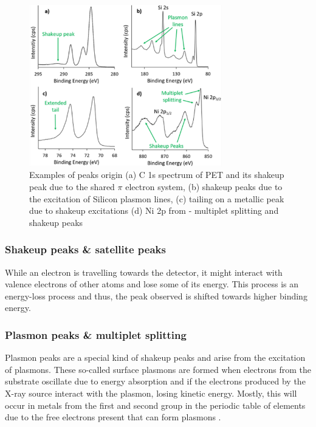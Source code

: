 \begin{figure}[H]
    \centering
    \includegraphics[width=0.75\textwidth]{Figures/peaks.png}
    \caption{Examples of peaks origin (a) C 1s spectrum of PET and its shakeup peak due to the shared $\pi$ electron system, (b) shakeup peaks due to the excitation of Silicon plasmon lines, (c) tailing on a metallic peak due to shakeup excitations (d) Ni 2p from  - multiplet splitting and shakeup peaks \cite{stevie_introduction_2020}}
    \label{fig:peaks}
\end{figure}

\subsubsection{Shakeup peaks \& satellite peaks}

While an electron is travelling towards the detector, it might interact with valence electrons of other atoms and lose some of its energy. This process is an energy-loss process and thus, the peak observed is shifted towards higher binding energy.

\subsubsection{Plasmon peaks \& multiplet splitting}

Plasmon peaks are a special kind of shakeup peaks and arise from the excitation of plasmons. These so-called surface plasmons are formed when electrons from the substrate oscillate due to energy absorption and if the electrons produced by the X-ray source interact with the plasmon, losing kinetic energy. Mostly, this will occur in metals from the first and second group in the periodic table of elements due to the free electrons present that can form plasmons \cite{moulder_handbook_1992}.

